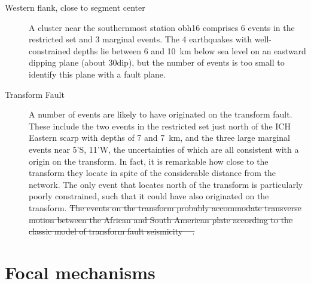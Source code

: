 \documentclass[jgr]{agu2001}
\newlength{\tw}
\providecommand{\DIFdel}[1]{{\protect\color{red}\sout{#1}}}                      %
\providecommand{\DIFdelbegin}{} %
\providecommand{\DIFdelend}{} %
\begin{document}
\begin{article}
\begin{description}
\item[Western flank, close to segment center]
A cluster near the southernmost station obh16
comprises 6 events in the restricted set and 3 marginal events.
The 4 earthquakes with well-constrained depths lie between  6 and
10~km below sea level on an eastward
dipping plane (about 30\dg dip), but the number of events is too small to identify this
plane with a fault plane.

\item[Transform Fault]  A number of events are likely to have
originated on the transform fault.  These include the two events in the
restricted set just north of the ICH Eastern scarp with depths of
7 and 7~km, and the three
large marginal events near 5'S, 11'W, the uncertainties of
which are all consistent with a origin on the transform. In fact, it
is remarkable how close to the transform they locate in spite of  the
considerable distance from the network.  The only event that locates  north of the transform is
particularly poorly constrained, such that it could have also
originated on the transform.  
\DIFdelbegin \DIFdel{The events on the transform probably
accommodate transverse motion between the African and South American
plate according to the classic model of transform fault seismicity \mbox{%
\citep{sykes67}}%
.
}\DIFdelend %
\end{description}

\section{Focal mechanisms}


\end{article}
\end{document}

